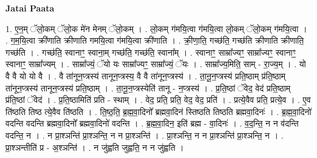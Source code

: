 \documentclass[17pt]{extarticle}
\begin{document}
\textbf{Jatai Paata} \newline

1. ए॒न॒म् ॅलो॒कम् ॅलो॒क मे॑न मेनम् ॅलो॒कम् । . लो॒कम् ग॑मयि॒त्वा ग॑मयि॒त्वा लो॒कम् ॅलो॒कम् ग॑मयि॒त्वा । . ग॒म॒यि॒त्वा क्री॑णाति क्रीणाति गमयि॒त्वा ग॑मयि॒त्वा क्री॑णाति । . क्री॒णा॒ति॒ गच्छ॑ति॒ गच्छ॑ति क्रीणाति क्रीणाति॒ गच्छ॑ति । . गच्छ॑ति॒ स्वानाꣳ॒॒ स्वाना॒म् गच्छ॑ति॒ गच्छ॑ति॒ स्वाना᳚म् । . स्वानाꣳ॒॒ साम्रा᳚ज्यꣳ॒॒ साम्रा᳚ज्यꣳ॒॒ स्वानाꣳ॒॒ स्वानाꣳ॒॒ साम्रा᳚ज्यम् । . साम्रा᳚ज्यं॒ ॅयो यः साम्रा᳚ज्यꣳ॒॒ साम्रा᳚ज्यं॒ ॅयः । . साम्रा᳚ज्य॒मिति॒ साम् - रा॒ज्य॒म् । . यो वै वै यो यो वै । . वै ता॑नून॒प्त्रस्य॑ तानून॒प्त्रस्य॒ वै वै ता॑नून॒प्त्रस्य॑ । . ता॒नू॒न॒प्त्रस्य॑ प्रति॒ष्ठाम् प्र॑ति॒ष्ठाम् ता॑नून॒प्त्रस्य॑ तानून॒प्त्रस्य॑ प्रति॒ष्ठाम् । . ता॒नू॒न॒प्त्रस्येति॑ तानू - न॒प्त्रस्य॑ । . प्र॒ति॒ष्ठां ॅवेद॒ वेद॑ प्रति॒ष्ठाम् प्र॑ति॒ष्ठां ॅवेद॑ । . प्र॒ति॒ष्ठामिति॑ प्रति - स्थाम् । . वेद॒ प्रति॒ प्रति॒ वेद॒ वेद॒ प्रति॑ । . प्रत्ये॒वैव प्रति॒ प्रत्ये॒व । . ए॒व ति॑ष्ठति तिष्ठ त्ये॒वैव ति॑ष्ठति । . ति॒ष्ठ॒ति॒ ब्र॒ह्म॒वा॒दिनो᳚ ब्रह्मवा॒दिन॑ स्तिष्ठति तिष्ठति ब्रह्मवा॒दिनः॑ । . ब्र॒ह्म॒वा॒दिनो॑ वदन्ति वदन्ति ब्रह्मवा॒दिनो᳚ ब्रह्मवा॒दिनो॑ वदन्ति । . ब्र॒ह्म॒वा॒दिन॒ इति॑ ब्रह्म - वा॒दिनः॑ । . व॒द॒न्ति॒ न न व॑दन्ति वदन्ति॒ न । . न प्रा॒श्ञन्ति॑ प्रा॒श्ञन्ति॒ न न प्रा॒श्ञन्ति॑ । . प्रा॒श्ञन्ति॒ न न प्रा॒श्ञन्ति॑ प्रा॒श्ञन्ति॒ न । . प्रा॒श्ञन्तीति॑ प्र - अ॒श्ञन्ति॑ । . न जु॑ह्वति जुह्वति॒ न न जु॑ह्वति । \newline
\end{document}
